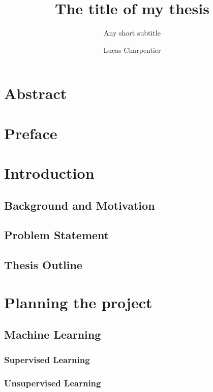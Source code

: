 \documentclass[UKenglish]{ifimaster}
\title{The title of my thesis}
\subtitle{Any short subtitle}
\author{Lucas Charpentier}
\begin{document}
\duoforside[program={Computational Science},
    option={Imaging and Biomedical Computing},
    dept={Departement of Informatics \and Departement of Physics},
    long
    ]
\frontmatter{}
\maketitle{}

\chapter*{Abstract}
\tableofcontents{}
\listoffigures{}
\listoftables{}

\chapter*{Preface}

\mainmatter{}

\chapter{Introduction}
    \section{Background and Motivation}
    
    
    \section{Problem Statement}


    \section{Thesis Outline}


\chapter{Planning the project}
    \section{Machine Learning}
        \subsection{Supervised Learning}
        
        
        \subsection{Unsupervised Learning}
\end{document}
